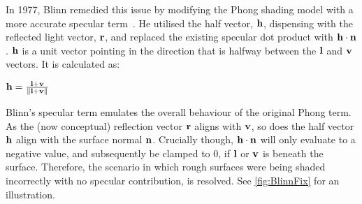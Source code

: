 In 1977, Blinn remedied this issue by modifying the Phong shading model with a more accurate specular term~\cite{BlinnModelsOfLightReflection}. He utilised the half vector, \begin{math}\mathbf{h}\end{math}, dispensing with the reflected light vector, \begin{math}\mathbf{r}\end{math}, and replaced the existing specular dot product with \begin{math}\mathbf{h}\cdot\mathbf{n}\end{math}. \begin{math}\mathbf{h}\end{math} is a unit vector pointing in the direction that is halfway between the \begin{math}\mathbf{l}\end{math} and \begin{math}\mathbf{v}\end{math} vectors. It is calculated as:

\begin{center}
	\begin{math}\mathbf{h} = \frac{\mathbf{l} + \mathbf{v}}{\norm{\mathbf{l} + \mathbf{v}}}\end{math}
\end{center}

Blinn's specular term emulates the overall behaviour of the original Phong term. As the (now conceptual) reflection vector \begin{math}\mathbf{r}\end{math} aligns with \begin{math}\mathbf{v}\end{math}, so does the half vector \begin{math}\mathbf{h}\end{math} align with the surface normal \begin{math}\mathbf{n}\end{math}. Crucially though, \begin{math}\mathbf{h}\cdot\mathbf{n}\end{math} will only evaluate to a negative value, and subsequently be clamped to 0, if \begin{math}\mathbf{l}\end{math} or \begin{math}\mathbf{v}\end{math} is beneath the surface. Therefore, the scenario in which rough surfaces were being shaded incorrectly with no specular contribution, is resolved. See \ref{fig:BlinnFix} for an illustration.


